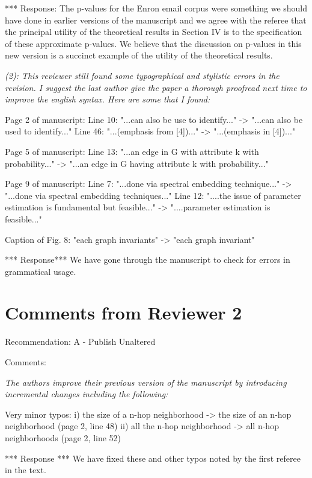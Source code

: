\documentclass{article}
\begin{document}
*** Response: The p-values for the Enron email corpus were something we
should have done in earlier versions of the manuscript and we agree
with the referee that the principal utility of the theoretical results
in Section IV is to the specification of these approximate
p-values. We believe that the discussion on p-values in this new
version is a succinct example of the utility of the theoretical results. 

{\em (2): This reviewer still found some typographical and stylistic errors in
the revision. I suggest the last author give the paper a thorough
proofread next time to improve the english syntax.  Here are some that
I found:

Page 2 of manuscript: 
Line 10: "...can also be use to identify..." ->
"...can also be used to identify..."  
Line 46: "...(emphasis from
[4])..." -> "...(emphasis in [4])..."

Page 5 of manuscript: 
Line 13: "...an edge in G with attribute k with
probability..." -> "...an edge in G having attribute k with
probability..."

Page 9 of manuscript:
Line 7: "...done via spectral embedding technique..." ->  
"...done via spectral embedding techniques..."
Line 12: "....the issue of parameter estimation is fundamental but
feasible..." -> "....parameter estimation is  feasible..."

Caption of Fig. 8: "each graph invariants" -> "each graph invariant"
}

*** Response*** 
We have gone through the manuscript to check for errors in grammatical usage.

\section{Comments from Reviewer 2}
Recommendation: A - Publish Unaltered

Comments: 
{\em The authors improve their previous version of the manuscript
by introducing incremental changes including the following:

Very minor typos: i) the size of a n-hop neighborhood -> the size of
an n-hop neighborhood (page 2, line 48) ii) all the n-hop neighborhood
-> all n-hop neighborhoods (page 2, line 52)}

*** Response ***
We have fixed these and other typos noted by the first referee in the text.
\end{document}
